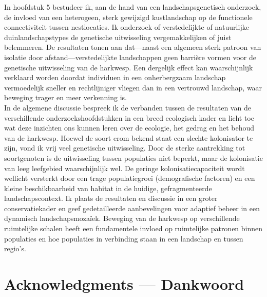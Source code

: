 \documentclass[10pt, twoside]{book} %
\renewcommand{\chaptermark}[1]{\markboth{#1}{}}
\begin{document}
  In hoofdstuk 5 bestudeer ik, aan de hand van een landschapsgenetisch onderzoek, de invloed van een heterogeen, sterk gewijzigd kustlandschap op de functionele connectiviteit tussen nestlocaties. Ik onderzoek of verstedelijkte of natuurlijke duinlandschapstypes de genetische uitwisseling vergemakkelijken of juist belemmeren. De resultaten tonen aan dat---naast een algemeen sterk patroon van isolatie door afstand---verstedelijkte landschappen geen barrière vormen voor de genetische uitwisseling van de harkwesp. Een dergelijk effect kan waarschijnlijk verklaard worden doordat individuen in een onherbergzaam landschap vermoedelijk sneller en rechtlijniger vliegen dan in een vertrouwd landschap, waar beweging trager en meer verkenning is.\\
  
  In de algemene discussie bespreek ik de verbanden tussen de resultaten van de verschillende onderzoekshoofdstukken in een breed ecologisch kader en licht toe wat deze inzichten ons kunnen leren over de ecologie, het gedrag en het behoud van de harkwesp. Hoewel de soort erom bekend staat een slechte kolonisator te zijn, vond ik vrij veel genetische uitwisseling. Door de sterke aantrekking tot soortgenoten is de uitwisseling tussen populaties niet beperkt, maar de kolonisatie van leeg leefgebied waarschijnlijk wel. De geringe kolonisatiecapaciteit wordt wellicht versterkt door een trage populatiegroei (demografische factoren) en een kleine beschikbaarheid van habitat in de huidige, gefragmenteerde landschapscontext. Ik plaats de resultaten en discussie in een groter conservatiekader en geef gedetailleerde aanbevelingen voor adaptief beheer in een dynamisch landschapsmozaïek. Beweging van de harkwesp op verschillende ruimtelijke schalen heeft een fundamentele invloed op ruimtelijke patronen binnen populaties en hoe populaties in verbinding staan in een landschap en tussen regio's.
  
                       
\clearpage

%
\newpage{\thispagestyle{empty}\cleardoublepage}
\ClearWallPaper
	
\chapter*{Acknowledgments --- Dankwoord}
\pagestyle{mainmatter}
\chaptermark{Acknowledgments --- Dankwoord}
\label{Acknowledgments}
	
\end{document}
